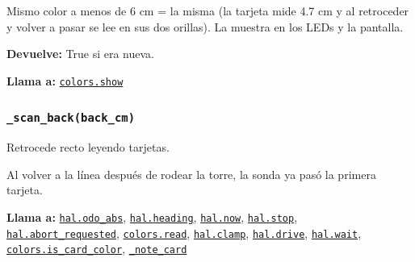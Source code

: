 Mismo color a menos de 6 cm = la misma (la tarjeta mide 4.7 cm y al retroceder y volver a pasar se lee en sus dos orillas). La muestra en los LEDs y la pantalla.

\par{}\par\smallskip
\noindent\textbf{Devuelve:} True si era nueva.\par
\noindent\textbf{Llama a:} \hyperref[fn:colors:show]{\texttt{colors.show}}\par

\subsubsection{\texttt{\_\allowbreak{}scan\_\allowbreak{}back(back\_\allowbreak{}cm)}}\label{fn:autonomous:-scan-back}
\noindent Retrocede recto leyendo tarjetas.

Al volver a la línea después de rodear la torre, la sonda ya pasó la primera tarjeta.

\par{}\par\smallskip
\noindent\textbf{Llama a:} \hyperref[fn:hal:odo-abs]{\texttt{hal.odo\_\allowbreak{}abs}}, \hyperref[fn:hal:heading]{\texttt{hal.heading}}, \hyperref[fn:hal:now]{\texttt{hal.now}}, \hyperref[fn:hal:stop]{\texttt{hal.stop}}, \hyperref[fn:hal:abort-requested]{\texttt{hal.abort\_\allowbreak{}requested}}, \hyperref[fn:colors:read]{\texttt{colors.read}}, \hyperref[fn:hal:clamp]{\texttt{hal.clamp}}, \hyperref[fn:hal:drive]{\texttt{hal.drive}}, \hyperref[fn:hal:wait]{\texttt{hal.wait}}, \hyperref[fn:colors:is-card-color]{\texttt{colors.is\_\allowbreak{}card\_\allowbreak{}color}}, \hyperref[fn:autonomous:-note-card]{\texttt{\_\allowbreak{}note\_\allowbreak{}card}}\par

